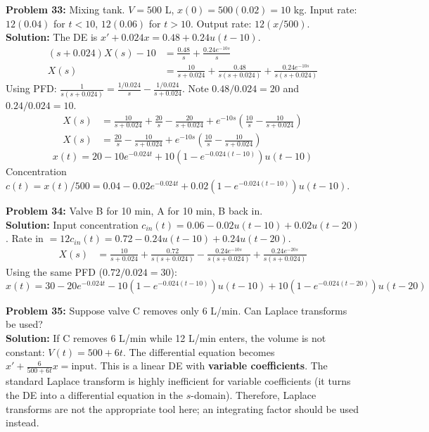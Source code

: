 \documentclass[11pt, letterpaper]{article}
\theoremstyle{definition}
\theoremstyle{remark}
\begin{document}
\textbf{Problem 33:} Mixing tank. $V=500$ L, $x(0) = 500(0.02) = 10$ kg. 
Input rate: $12(0.04)$ for $t<10$, $12(0.06)$ for $t>10$. Output rate: $12(x/500)$.
\\[4pt]
\textbf{Solution:}
The DE is $x' + 0.024x = 0.48 + 0.24u(t-10)$.
\begin{align*}
(s+0.024)X(s) - 10 &= \frac{0.48}{s} + \frac{0.24e^{-10s}}{s} \\
X(s) &= \frac{10}{s+0.024} + \frac{0.48}{s(s+0.024)} + \frac{0.24e^{-10s}}{s(s+0.024)}
\end{align*}
Using PFD: $\frac{1}{s(s+0.024)} = \frac{1/0.024}{s} - \frac{1/0.024}{s+0.024}$. Note $0.48/0.024 = 20$ and $0.24/0.024 = 10$.
\begin{align*}
X(s) &= \frac{10}{s+0.024} + \frac{20}{s} - \frac{20}{s+0.024} + e^{-10s}\left(\frac{10}{s} - \frac{10}{s+0.024}\right) \\
X(s) &= \frac{20}{s} - \frac{10}{s+0.024} + e^{-10s}\left(\frac{10}{s} - \frac{10}{s+0.024}\right)
\end{align*}
\[
x(t) = 20 - 10e^{-0.024t} + 10(1 - e^{-0.024(t-10)})u(t-10)
\]
Concentration $c(t) = x(t)/500 = 0.04 - 0.02e^{-0.024t} + 0.02(1 - e^{-0.024(t-10)})u(t-10)$.

\textbf{Problem 34:} Valve B for 10 min, A for 10 min, B back in.
\\[4pt]
\textbf{Solution:}
Input concentration $c_{in}(t) = 0.06 - 0.02u(t-10) + 0.02u(t-20)$.
Rate in $= 12 c_{in}(t) = 0.72 - 0.24u(t-10) + 0.24u(t-20)$.
\begin{align*}
X(s) &= \frac{10}{s+0.024} + \frac{0.72}{s(s+0.024)} - \frac{0.24e^{-10s}}{s(s+0.024)} + \frac{0.24e^{-20s}}{s(s+0.024)}
\end{align*}
Using the same PFD ($0.72/0.024 = 30$):
\[
x(t) = 30 - 20e^{-0.024t} - 10(1 - e^{-0.024(t-10)})u(t-10) + 10(1 - e^{-0.024(t-20)})u(t-20)
\]

\textbf{Problem 35:} Suppose valve C removes only 6 L/min. Can Laplace transforms be used?
\\[4pt]
\textbf{Solution:}
If C removes 6 L/min while 12 L/min enters, the volume is not constant: $V(t) = 500 + 6t$. The differential equation becomes $x' + \frac{6}{500+6t}x = \text{input}$. This is a linear DE with \textbf{variable coefficients}. The standard Laplace transform is highly inefficient for variable coefficients (it turns the DE into a differential equation in the $s$-domain). Therefore, Laplace transforms are not the appropriate tool here; an integrating factor should be used instead.
\end{document}
